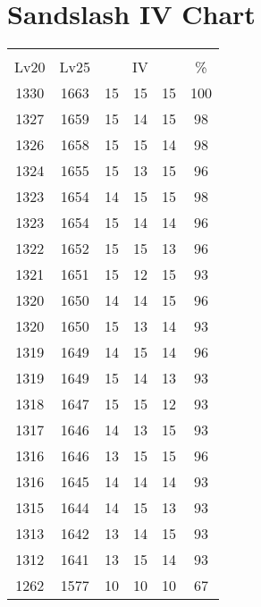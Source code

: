 \documentclass{article}%
\begin{document}
%
\normalsize%
\section{Sandslash IV Chart}%
\label{sec:Sandslash IV Chart}%
\renewcommand{\arraystretch}{1.5}%
\begin{tabular}{|c|c|c|c|c|c|}%
\hline%
\multicolumn{6}{|c|}{\textcolor{white}{ 
\linebreak{Sandslash}
}%
\cellcolor{black}}\\%
\multicolumn{1}{|c}{Lv20}&\multicolumn{1}{c|}{Lv25}&\multicolumn{3}{c|}{IV}&\multicolumn{1}{|c|}{\%}\\%
\hline%
\rowcolor{color100}%
1330&1663&15&15&15&100\\%
\hline%
\rowcolor{color98}%
1327&1659&15&14&15&98\\%
\hline%
\rowcolor{color98}%
1326&1658&15&15&14&98\\%
\hline%
\rowcolor{color96}%
1324&1655&15&13&15&96\\%
\hline%
\rowcolor{color98}%
1323&1654&14&15&15&98\\%
\hline%
\rowcolor{color96}%
1323&1654&15&14&14&96\\%
\hline%
\rowcolor{color96}%
1322&1652&15&15&13&96\\%
\hline%
\rowcolor{color93}%
1321&1651&15&12&15&93\\%
\hline%
\rowcolor{color96}%
1320&1650&14&14&15&96\\%
\hline%
\rowcolor{color93}%
1320&1650&15&13&14&93\\%
\hline%
\rowcolor{color96}%
1319&1649&14&15&14&96\\%
\hline%
\rowcolor{color93}%
1319&1649&15&14&13&93\\%
\hline%
\rowcolor{color93}%
1318&1647&15&15&12&93\\%
\hline%
\rowcolor{color93}%
1317&1646&14&13&15&93\\%
\hline%
\rowcolor{color96}%
1316&1646&13&15&15&96\\%
\hline%
\rowcolor{color93}%
1316&1645&14&14&14&93\\%
\hline%
\rowcolor{color93}%
1315&1644&14&15&13&93\\%
\hline%
\rowcolor{color93}%
1313&1642&13&14&15&93\\%
\hline%
\rowcolor{color93}%
1312&1641&13&15&14&93\\%
\hline%
\rowcolor{color91}%
1262&1577&10&10&10&67\\%
\end{tabular}

%
\end{document}
